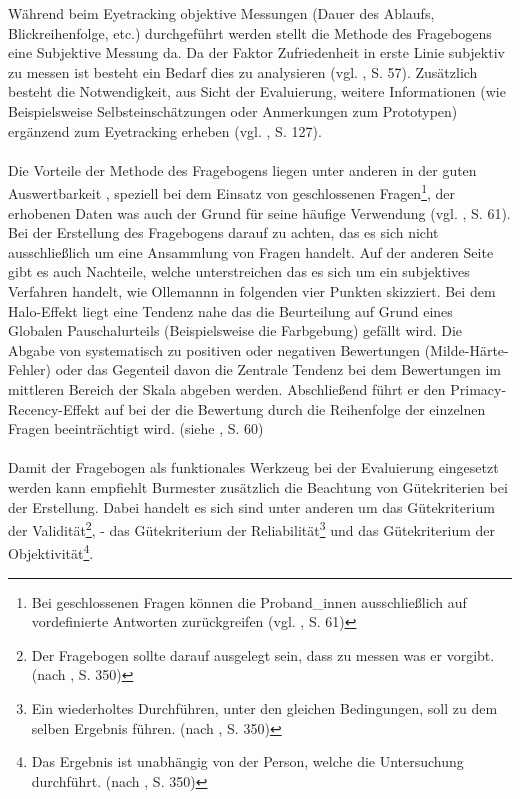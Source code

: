 \documentclass[Bachelorarbeit.tex]{subfiles}
\begin{document}
Während beim Eyetracking objektive Messungen  (Dauer des Ablaufs, Blickreihenfolge, etc.) durchgeführt werden stellt die Methode des Fragebogens eine Subjektive Messung da.
Da der Faktor Zufriedenheit in erste Linie subjektiv zu messen ist besteht ein Bedarf dies zu analysieren (vgl. \cite{Ollermann2007}, S. 57).
Zusätzlich besteht die Notwendigkeit, aus Sicht der Evaluierung, weitere Informationen (wie Beispielsweise Selbsteinschätzungen oder Anmerkungen zum Prototypen) ergänzend zum Eyetracking erheben (vgl. \cite{Laugwitz2006}, S. 127). \\
\\
Die Vorteile der Methode des Fragebogens liegen unter anderen in der guten Auswertbarkeit , speziell bei dem Einsatz von geschlossenen Fragen\footnote{Bei geschlossenen Fragen können die Proband\_innen ausschließlich auf vordefinierte Antworten zurückgreifen (vgl. \cite{Ollermann2007}, S. 61)}, der erhobenen Daten was auch der Grund für seine häufige Verwendung (vgl. \cite{Ollermann2007}, S. 61). 
Bei der Erstellung des Fragebogens darauf zu achten, das es sich nicht ausschließlich um eine Ansammlung von Fragen handelt.
Auf der anderen Seite gibt es auch Nachteile, welche unterstreichen das es sich um ein subjektives Verfahren handelt, wie Ollemannn in folgenden vier Punkten skizziert.
Bei dem Halo-Effekt liegt eine Tendenz nahe das die Beurteilung auf Grund eines Globalen Pauschalurteils (Beispielsweise die Farbgebung) gefällt wird.
Die Abgabe von systematisch zu positiven oder negativen Bewertungen (Milde-Härte-Fehler) oder das Gegenteil davon die Zentrale Tendenz bei dem Bewertungen im mittleren Bereich der Skala abgeben werden.
Abschließend führt er den Primacy-Recency-Effekt auf bei der die Bewertung durch die Reihenfolge der einzelnen Fragen beeinträchtigt wird. (siehe \cite{Ollermann2007}, S. 60)\\
\\
Damit der Fragebogen als funktionales Werkzeug bei der Evaluierung eingesetzt werden kann empfiehlt Burmester zusätzlich die Beachtung von Gütekriterien bei der Erstellung. 
Dabei handelt es sich sind unter anderen um das Gütekriterium der Validität\footnote{Der Fragebogen sollte darauf ausgelegt sein, dass zu messen was er vorgibt. (nach \cite{Burmester}, S. 350)}, - das Gütekriterium der Reliabilität\footnote{Ein wiederholtes Durchführen, unter den gleichen Bedingungen, soll zu dem selben Ergebnis führen. (nach \cite{Burmester}, S. 350)} und das Gütekriterium der Objektivität\footnote{Das Ergebnis ist unabhängig von der Person, welche die Untersuchung durchführt. (nach \cite{Burmester}, S. 350)}. \\
\end{document}
